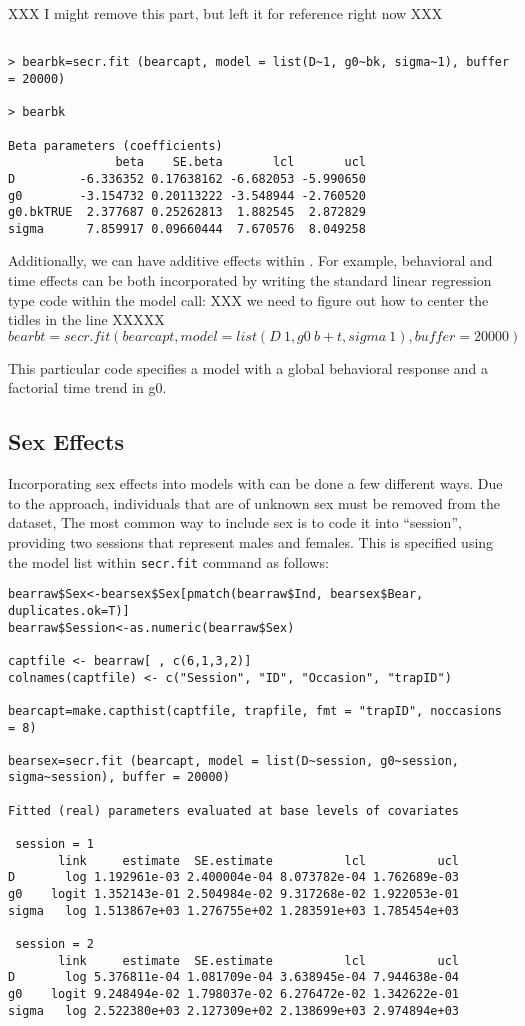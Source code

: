XXX I might remove this part, but left it for reference right now XXX
{\small
\begin{verbatim}

> bearbk=secr.fit (bearcapt, model = list(D~1, g0~bk, sigma~1), buffer = 20000)

> bearbk

Beta parameters (coefficients)
               beta    SE.beta       lcl       ucl
D         -6.336352 0.17638162 -6.682053 -5.990650
g0        -3.154732 0.20113222 -3.548944 -2.760520
g0.bkTRUE  2.377687 0.25262813  1.882545  2.872829
sigma      7.859917 0.09660444  7.670576  8.049258
\end{verbatim}
}

Additionally, we can have additive effects within \secr.  For example, behavioral and time effects can be both incorporated by writing the standard linear regression type code within the model call:
XXX we need to figure out how to center the tidles in the line XXXXX
\[
bearbt=secr.fit (bearcapt, model = list(D~1, g0~b + t, sigma~1), buffer = 20000)
\]

This particular code specifies a model with a global behavioral response and a factorial time trend in g0.


\subsection{Sex Effects}

Incorporating sex effects into models with \secr can be done a few
different ways.  Due to the approach, individuals that
are of unknown sex must be removed from the dataset,
The most common way to include
sex is to code it into ``session'', providing two sessions that
represent males and females.  This is specified using the model list
within \mbox{\tt secr.fit} command as follows:
{\small
\begin{verbatim}
bearraw$Sex<-bearsex$Sex[pmatch(bearraw$Ind, bearsex$Bear, duplicates.ok=T)]
bearraw$Session<-as.numeric(bearraw$Sex)

captfile <- bearraw[ , c(6,1,3,2)]
colnames(captfile) <- c("Session", "ID", "Occasion", "trapID")

bearcapt=make.capthist(captfile, trapfile, fmt = "trapID", noccasions = 8)

bearsex=secr.fit (bearcapt, model = list(D~session, g0~session, sigma~session), buffer = 20000)

Fitted (real) parameters evaluated at base levels of covariates

 session = 1
       link     estimate  SE.estimate          lcl          ucl
D       log 1.192961e-03 2.400004e-04 8.073782e-04 1.762689e-03
g0    logit 1.352143e-01 2.504984e-02 9.317268e-02 1.922053e-01
sigma   log 1.513867e+03 1.276755e+02 1.283591e+03 1.785454e+03

 session = 2
       link     estimate  SE.estimate          lcl          ucl
D       log 5.376811e-04 1.081709e-04 3.638945e-04 7.944638e-04
g0    logit 9.248494e-02 1.798037e-02 6.276472e-02 1.342622e-01
sigma   log 2.522380e+03 2.127309e+02 2.138699e+03 2.974894e+03
\end{verbatim}
}

